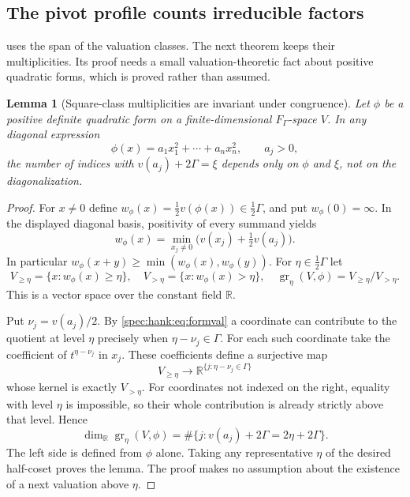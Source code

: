 \documentclass[11pt,a4paper]{article}
\numberwithin{equation}{section}
\newtheorem{lemma}[lemma]{Lemma}
\theoremstyle{definition}
\theoremstyle{remark}
\newcommand{\R}{\mathbb R}
\begin{document}
\subsection{The pivot profile counts irreducible factors}
\label{spec:hank:sub:profile}

 uses the span of the valuation classes. The next
theorem keeps their multiplicities. Its proof needs a small
valuation-theoretic fact about positive quadratic forms, which is proved
rather than assumed.

\begin{lemma}[Square-class multiplicities are invariant under congruence]
\label{spec:hank:lem:graded}
Let $\phi$ be a positive definite quadratic form on a finite-dimensional
$F_\Gamma$-space $V$. In any diagonal expression
\[
 \phi(x)=a_1x_1^2+\cdots+a_nx_n^2,\qquad a_j>0,
\]
the number of indices with $v(a_j)+2\Gamma=\xi$ depends only on $\phi$ and
$\xi$, not on the diagonalization.
\end{lemma}
\begin{proof}
For $x\ne0$ define $w_\phi(x)=\tfrac12v(\phi(x))\in\tfrac12\Gamma$, and put
$w_\phi(0)=\infty$. In the displayed diagonal basis, positivity of every
summand yields
\begin{equation}\label{spec:hank:eq:formval}
 w_\phi(x)=\min_{x_j\ne0}\bigl(v(x_j)+\tfrac12v(a_j)\bigr).
\end{equation}
In particular $w_\phi(x+y)\ge\min(w_\phi(x),w_\phi(y))$. For
$\eta\in\tfrac12\Gamma$ let
\[
 V_{\ge\eta}=\{x:w_\phi(x)\ge\eta\},\quad
 V_{>\eta}=\{x:w_\phi(x)>\eta\},\quad
 \operatorname{gr}_\eta(V,\phi)=V_{\ge\eta}/V_{>\eta}.
\]
This is a vector space over the constant field $\R$.

Put $\nu_j=v(a_j)/2$. By \eqref{spec:hank:eq:formval} a coordinate can
contribute to the quotient at level $\eta$ precisely when
$\eta-\nu_j\in\Gamma$. For each such coordinate take the coefficient of
$t^{\eta-\nu_j}$ in $x_j$. These coefficients define a surjective map
\[
 V_{\ge\eta}\longrightarrow
 \R^{\{j:\eta-\nu_j\in\Gamma\}}
\]
whose kernel is exactly $V_{>\eta}$. For coordinates not indexed on the
right, equality with level $\eta$ is impossible, so their whole contribution
is already strictly above that level. Hence
\[
 \dim_\R\operatorname{gr}_\eta(V,\phi)
   =\#\{j:v(a_j)+2\Gamma=2\eta+2\Gamma\}.
\]
The left side is defined from $\phi$ alone. Taking any representative $\eta$
of the desired half-coset proves the lemma. The proof makes no assumption
about the existence of a next valuation above $\eta$.
\end{proof}
\end{document}
